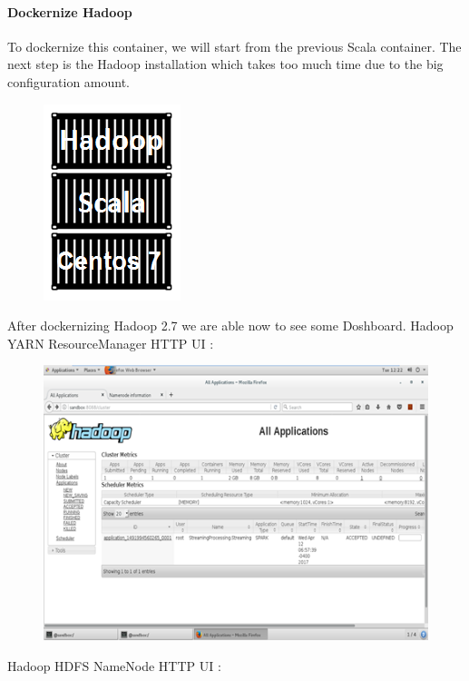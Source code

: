 \paragraph{Dockernize Hadoop}
\label{sec:sec01}
To dockernize this container, we will start from the previous Scala container. 
The next step is the Hadoop installation which takes too much time due to the big configuration amount.
\begin{figure}[h!]
	\centering
	\includegraphics[height=0.2\textheight]{fig01/HadoopContainer}
	\label{fig:FilialesEtClients}
\end{figure}
\newpage
After dockernizing Hadoop 2.7 we are able now to see some Doshboard.
Hadoop YARN ResourceManager HTTP UI :
\begin{figure}[h!]
	\centering
	\includegraphics[height=0.4\textheight]{fig01/HadoopYarnDashboard}
	\label{fig:FilialesEtClients}
\end{figure}
\newline
Hadoop HDFS NameNode HTTP UI :
